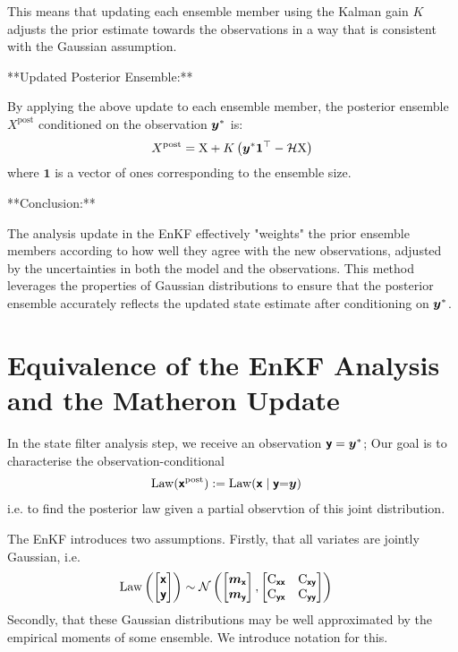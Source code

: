 \documentclass{article}
\begin{document}
This means that updating each ensemble member using the Kalman gain \( K \) adjusts the prior estimate towards the observations in a way that is consistent with the Gaussian assumption.

**Updated Posterior Ensemble:**

By applying the above update to each ensemble member, the posterior ensemble \( X^\text{post} \) conditioned on the observation \(\boldsymbol{y}^*\) is:
\[
X^\text{post} = \mathrm{X} + K \left(\boldsymbol{y}^*\mathbf{1}^\top - \mathcal{H} \mathrm{X} \right)
\]
where \( \mathbf{1} \) is a vector of ones corresponding to the ensemble size.

**Conclusion:**

The analysis update in the EnKF effectively "weights" the prior ensemble members according to how well they agree with the new observations, adjusted by the uncertainties in both the model and the observations. This method leverages the properties of Gaussian distributions to ensure that the posterior ensemble accurately reflects the updated state estimate after conditioning on \(\boldsymbol{y}^*\).

\section{Equivalence of the EnKF Analysis and the Matheron Update}


In the state filter analysis step, we receive an observation $\boldsymbol{\mathsf{y}}=\boldsymbol{y}^*$;
Our goal is to characterise the observation-conditional
\begin{align}
    \operatorname{Law}(\boldsymbol{\mathsf{x}}^{\text{post}})&:=\operatorname{Law}(\boldsymbol{\mathsf{x}}\mid \boldsymbol{\mathsf{y}}{=}\boldsymbol{y})
\end{align}
i.e. to find the posterior law given a partial observtion of this joint distribution.

The EnKF introduces two assumptions.
Firstly, that all variates are jointly Gaussian, i.e.
\begin{align}
    \operatorname{Law} \left( \begin{bmatrix}
        \boldsymbol{\mathsf{x}}\\
        \boldsymbol{\mathsf{y}}
    \end{bmatrix}\right) &\sim \mathcal{N}\left(\begin{bmatrix} \boldsymbol{m}_{\boldsymbol{\mathsf{x}}} \\ \boldsymbol{m}_{\boldsymbol{\mathsf{y}}} \end{bmatrix}, \begin{bmatrix} \mathrm{C}_{\boldsymbol{\mathsf{xx}}} & \mathrm{C}_{\boldsymbol{\mathsf{xy}}} \\ \mathrm{C}_{\boldsymbol{\mathsf{yx}}} & \mathrm{C}_{\boldsymbol{\mathsf{yy}}} \end{bmatrix}\right)
\end{align}
Secondly, that these Gaussian distributions may be well approximated by the empirical moments of some ensemble.
We introduce notation for this.
\end{document}
